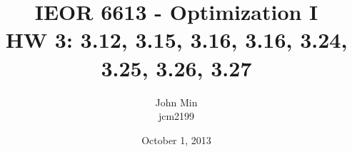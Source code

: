\documentclass{article}
\begin{document}
\title{IEOR 6613 - Optimization I\\ HW 3:  3.12, 3.15, 3.16, 3.16, 3.24, 3.25, 3.26, 3.27}

\author{John Min\\ jcm2199}
\date{October 1, 2013}
\maketitle
\pagebreak
\end{document}
